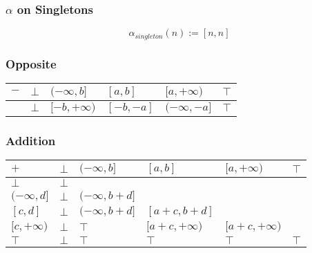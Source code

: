 \documentclass[aspectratio=169]{beamer}
\begin{document}
                    \begin{frame}
                        \frametitle{\( \alpha \) on Singletons}
                        \[
                            \alpha_{singleton}(n) := [n, n]  
                        \]
                    \end{frame}
                    
                    
                    \begin{frame}
                        \frametitle{Opposite}
                        \begin{table}[]
                            \begin{tabular}{|l|l|l|l|l|l|}
                            \hline
                            $-$ & $\bot$ & $(-\infty , b]$ & $[a, b]$   & $[a, + \infty )$  & $\top$ \\ \hline
                                & $\bot$ & $[-b, + \infty )$ & $[-b, -a]$ & $(- \infty , -a]$ & $\top$ \\ \hline
                            \end{tabular}
                            \end{table}
                    \end{frame}

                    
        \begin{frame}
            \frametitle{Addition}
    \begin{table}[]
        \begin{tabular}{|l|l|l|l|l|l|}
        \hline
        $+$            & $\bot$ & $(-\infty, b]$     & $[a, b]$           & $[a, +\infty)$     & $\top$ \\ \hline
        $\bot$         & $\bot$ &                    &                    &                    &        \\ \hline
        $(-\infty, d]$ & $\bot$ & $(-\infty, b + d]$ &                    &                    &        \\ \hline
        $[c, d]$       & $\bot$ & $(-\infty, b + d]$ & $[a + c, b + d]$   &                    &        \\ \hline
        $[c, +\infty)$ & $\bot$ & $\top$             & $[a + c, +\infty)$ & $[a + c, +\infty)$ &        \\ \hline
        $\top$         & $\bot$ & $\top$             & $\top$             & $\top$             & $\top$ \\ \hline
        \end{tabular}
        \end{table}
    \end{frame}
    
\end{document}
